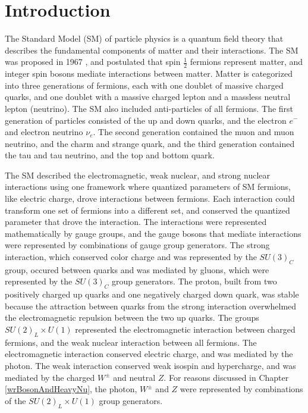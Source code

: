 \chapter{Introduction}
\label{intro_chapter}

The Standard Model (SM) of particle physics is a quantum field theory that describes the fundamental 
components of matter and their interactions.  The SM was proposed in 
1967 \cite{weinbergSM,salamSM}, and postulated that spin $\frac{1}{2}$ fermions represent matter, and 
integer spin bosons mediate interactions between matter.  Matter is categorized into three generations 
of fermions, each with one doublet of massive charged quarks, and one doublet with a massive charged 
lepton and a massless neutral lepton (neutrino).  The SM also included anti-particles of all fermions.  
The first generation of particles consisted of the up and down quarks, and the electron $e^{-}$ and electron neutrino $\nu_{e}$.  
The second generation contained the muon and muon neutrino, and the charm and strange quark, and the 
third generation contained the tau and tau neutrino, and the top and bottom quark.

The SM described the electromagnetic, weak nuclear, and strong nuclear interactions using one framework 
where quantized parameters of SM fermions, like electric charge, drove interactions between fermions.  
Each interaction could transform one set of fermions into a different set, and conserved the quantized 
parameter that drove the interaction.  The interactions were represented mathematically by gauge groups, and the 
gauge bosons that mediate interactions were represented by combinations of gauge group 
generators.  The strong interaction, which conserved color charge and was represented by the $SU(3)_{C}$ 
group, occured between quarks and was mediated by gluons, which were represented by the $SU(3)_{C}$ group 
generators.  The proton, built from two positively charged up quarks and one negatively charged down 
quark, was stable because the attraction between quarks from the strong interaction overwhelmed the 
electromagnetic repulsion between the two up quarks.  The groups $SU(2)_{L} \times U(1)$ represented the 
electromagnetic interaction between charged fermions, and the weak nuclear interaction between all fermions.  
The electromagnetic interaction conserved electric charge, and was mediated by the photon.  The weak 
interaction conserved weak isospin and hypercharge, and was mediated by the charged $W^{\pm}$ and neutral 
$Z$.  For reasons discussed in Chapter \ref{wrBosonAndHeavyNu}, the photon, $W^{\pm}$ and $Z$ were 
represented by combinations of the $SU(2)_{L} \times U(1)$ group generators.

